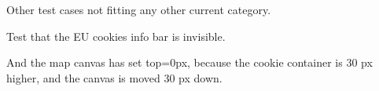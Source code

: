 \documentclass[letterpaper,10pt,english]{sphinxmanual}
\begin{document}
\begin{fulllineitems}
\label{test_general:test_general.TestMiscellaneous}
Other test cases not fitting any other current category.

\begin{fulllineitems}
\label{test_general:test_general.TestMiscellaneous.test_eu_cookies_info_bar_is_hidden}
Test that the EU cookies info bar is invisible.

And the map canvas has set top=0px,
because the cookie container is 30 px higher,
and the canvas is moved 30 px down.

\end{fulllineitems}


\end{fulllineitems}

\end{document}
